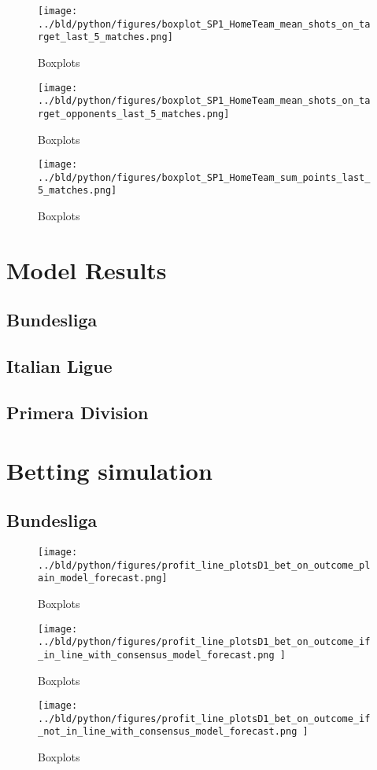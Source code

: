 \documentclass[11pt, a4paper, leqno]{article}
\begin{document}
\begin{figure}[H]
    \centering
    \texttt{[image: ../bld/python/figures/boxplot\_SP1\_HomeTeam\_mean\_shots\_on\_target\_last\_5\_matches.png]}
    \caption{Boxplots}
    \label{fig:figure2}
\end{figure}

\begin{figure}[H]
    \centering
    \texttt{[image: ../bld/python/figures/boxplot\_SP1\_HomeTeam\_mean\_shots\_on\_target\_opponents\_last\_5\_matches.png]}
    \caption{Boxplots}
    \label{fig:figure2}
\end{figure}

\begin{figure}[H]
    \centering
    \texttt{[image: ../bld/python/figures/boxplot\_SP1\_HomeTeam\_sum\_points\_last\_5\_matches.png]}
    \caption{Boxplots}
    \label{fig:figure2}
\end{figure}



\section{Model Results}
\subsection{Bundesliga}
\subsection{Italian Ligue }
\subsection{Primera Division}
\section{Betting simulation}
\subsection{Bundesliga}
\begin{figure}[H]
    \centering
    \texttt{[image: ../bld/python/figures/profit\_line\_plotsD1\_bet\_on\_outcome\_plain\_model\_forecast.png]}
    \caption{Boxplots}
    \label{fig:figure2}
\end{figure}

\begin{figure}[H]
    \centering
    \texttt{[image: ../bld/python/figures/profit\_line\_plotsD1\_bet\_on\_outcome\_if\_in\_line\_with\_consensus\_model\_forecast.png
    ]}
    \caption{Boxplots}
    \label{fig:figure2}
\end{figure}
\begin{figure}[H]
    \centering
    \texttt{[image: ../bld/python/figures/profit\_line\_plotsD1\_bet\_on\_outcome\_if\_not\_in\_line\_with\_consensus\_model\_forecast.png
    ]}
    \caption{Boxplots}
    \label{fig:figure2}
\end{figure}
\end{document}
